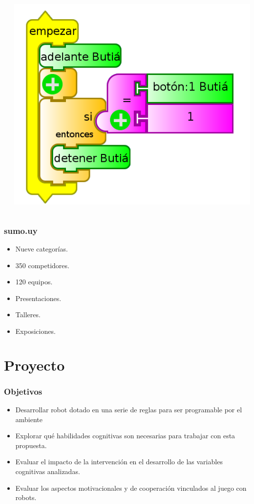 \documentclass[spanish]{beamer}
\begin{document}
\begin{frame}
\begin{columns}[T]
\begin{column}{.33\textwidth}
    \end{column}
    \begin{column}{.33\textwidth}
    \includegraphics[width=\textwidth]{tortuga.png}
    \end{column}
  \end{columns}
\end{frame}

\begin{frame}
\frametitle{sumo.uy}
	\begin{itemize}
		\item Nueve categorías.
		\item 350 competidores.
		\item 120 equipos.
		\item Presentaciones.
		\item Talleres.
		\item Exposiciones.
	\end{itemize}
\end{frame}

\section{Proyecto}

\begin{frame}
	\frametitle{Objetivos}
	\begin{itemize}
		\item Desarrollar robot dotado en una serie de reglas para ser programable por el ambiente 
		\item Explorar qué habilidades cognitivas son necesarias para trabajar con esta propuesta. 
		\item Evaluar el impacto de la intervención en el desarrollo de las variables cognitivas analizadas. 
		\item Evaluar los aspectos motivacionales y de cooperación vinculados al juego con robots.
	\end{itemize}
\end{frame}
\end{document}
